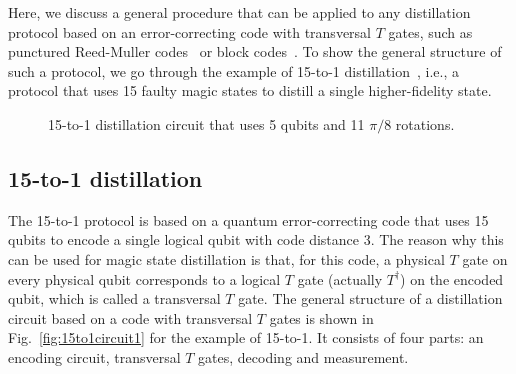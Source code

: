 \documentclass[prx,aps,letterpaper,twocolumn,allowfontchageintitle=true,accepted=2019-02-01]{quantumarticle}
\begin{document}
Here, we discuss a general procedure that can be applied to any distillation protocol based on an error-correcting code with transversal $T$ gates, such as punctured Reed-Muller codes~\cite{Bravyi2005,Haah2018} or block codes~\cite{Bravyi2012,Jones2013a,Fowler2013}. To show the general structure of such a protocol, we go through the example of 15-to-1 distillation~\cite{Bravyi2005}, i.e., a protocol that uses 15 faulty magic states to distill a single higher-fidelity state.

\begin{figure}[t!]
\centering
\def\svgwidth{0.79\linewidth}

\caption{15-to-1 distillation circuit that uses 5 qubits and 11 $\pi/8$ rotations.}
\label{fig:15to1circuit2}
\end{figure}

\subsection{15-to-1 distillation}

The 15-to-1 protocol is based on a quantum error-correcting code that uses 15 qubits to encode a single logical qubit with code distance 3. The reason why this can be used for magic state distillation is that, for this code, a physical $T$ gate on every physical qubit corresponds to a logical $T$ gate (actually $T^\dagger$) on the encoded qubit, which is called a transversal $T$ gate. The general structure of a distillation circuit based on a code with transversal $T$ gates is shown in Fig.~\ref{fig:15to1circuit1} for the example of 15-to-1. It consists of four parts: an encoding circuit, transversal $T$ gates, decoding and measurement.
\end{document}
